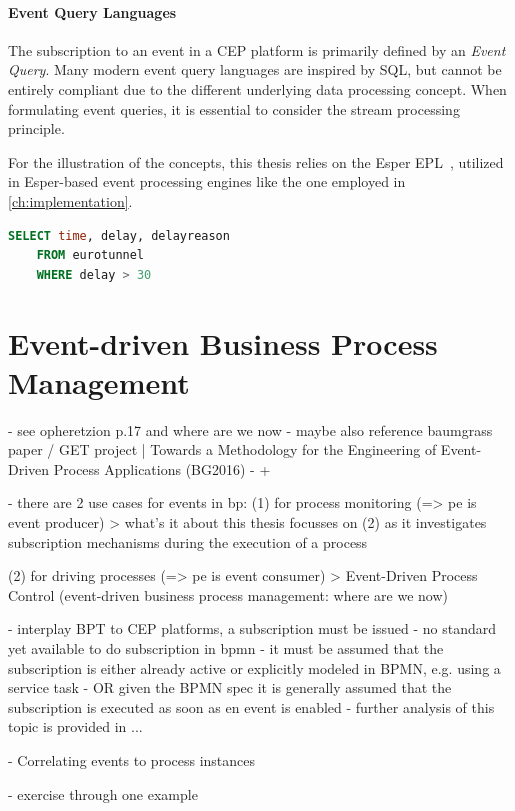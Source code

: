 
\paragraph{Event Query Languages}
The subscription to an event in a CEP platform is primarily defined by an \textit{Event Query}.
Many modern event query languages are inspired by \acs{SQL}, but cannot be entirely compliant due to the different underlying data processing concept.
When formulating event queries, it is essential to consider the stream processing principle.

For the illustration of the concepts, this thesis relies on the Esper \ac{EPL}~\cite{esperhome}, utilized in Esper-based event processing engines like the one employed in \autoref{ch:implementation}.


\begin{lstlisting}[language=sql,caption={Sample Query in Esper EPL},label=lst:epl-query-example]
	SELECT time, delay, delayreason
	FROM eurotunnel
	WHERE delay > 30
\end{lstlisting}

\section{Event-driven Business Process Management}
- see opheretzion p.17 and where are we now
- maybe also reference baumgrass paper / GET project | Towards a Methodology for the Engineering
of Event-Driven Process Applications (BG2016)
- + 

- there are 2 use cases for events in bp: 
(1) for process monitoring (=> pe is event producer)
> what's it about
this thesis focusses on (2) as it investigates subscription mechanisms during the execution of a process

(2) for driving processes (=> pe is event consumer)
> Event-Driven Process Control (event-driven business process management: where are we now)

- interplay BPT to CEP platforms, a subscription must be issued
- no standard yet available to do subscription in bpmn
- it must be assumed that the subscription is either already active or explicitly modeled in BPMN, e.g. using a service task
- OR given the BPMN spec it is generally assumed that the subscription is executed as soon as en event is enabled
- further analysis of this topic is provided in ...

- Correlating events to process instances

- exercise through one example



